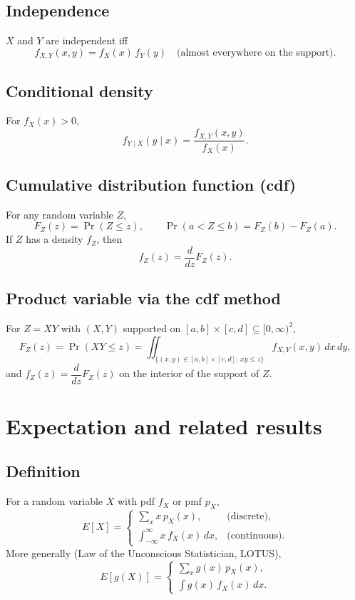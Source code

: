 \documentclass[12pt]{article}
\begin{document}
\subsection{Independence}
$X$ and $Y$ are independent iff
\[
f_{X,Y}(x,y)=f_X(x)\,f_Y(y)\quad\text{(almost everywhere on the support).}
\]

\subsection{Conditional density}
For $f_X(x)>0$,
\[
f_{Y\mid X}(y\mid x)=\frac{f_{X,Y}(x,y)}{f_X(x)}.
\]

\subsection{Cumulative distribution function (cdf)}
For any random variable $Z$,
\[
F_Z(z)=\Pr(Z\le z), \qquad \Pr(a<Z\le b)=F_Z(b)-F_Z(a).
\]
If $Z$ has a density $f_Z$, then
\[
f_Z(z)=\frac{d}{dz}F_Z(z).
\]

\subsection{Product variable via the cdf method}
For $Z=XY$ with $(X,Y)$ supported on $[a,b]\times[c,d]\subseteq[0,\infty)^2$,
\[
F_Z(z)=\Pr(XY\le z)=
\iint_{\{(x,y)\in[a,b]\times[c,d]:\,xy\le z\}} f_{X,Y}(x,y)\,dx\,dy,
\]
and $f_Z(z)=\dfrac{d}{dz}F_Z(z)$ on the interior of the support of $Z$.

\section{Expectation and related results}

\subsection{Definition}
For a random variable $X$ with pdf $f_X$ or pmf $p_X$,
\[
E[X]=
\begin{cases}
\displaystyle \sum_x x\,p_X(x), & \text{(discrete)},\\[2mm]
\displaystyle \int_{-\infty}^{\infty} x\,f_X(x)\,dx, & \text{(continuous)}.
\end{cases}
\]
More generally (Law of the Unconscious Statistician, LOTUS),
\[
E[g(X)] =
\begin{cases}
\displaystyle \sum_x g(x)\,p_X(x),\\[2mm]
\displaystyle \int g(x)\,f_X(x)\,dx.
\end{cases}
\]
\end{document}
